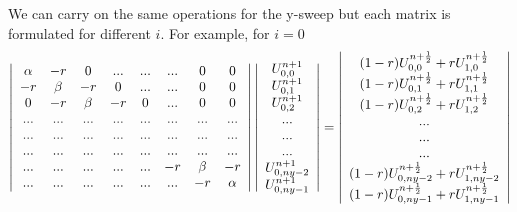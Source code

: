 We can carry on the same operations for the y-sweep but each matrix is formulated for different $i$. For example, for $i=0$ 
\[
\left| 
\begin{array}{ccc ccccc}
\alpha & -r      & 0     & ...  & ...  & ...  & 0       & 0      \\
-r     & \beta   & -r    & 0    & ...  & ...  & 0       & 0      \\
0      &  -r     &\beta  & -r   & 0    & ...  & 0       & 0      \\
...    & ...     & ...   & ...  & ...  & ...  & ...     & ...    \\
...    & ...     & ...   & ...  & ...  & ...  & ...     & ...    \\
...    & ...     & ...   & ...  & ...  & ...  & ...     & ...    \\
...    & ...     & ...   & ...  & ...  & -r   & \beta   & -r     \\
...    & ...     & ...   & ...  & ...  & ...  & -r      & \alpha \\
\end{array} 
\right|
\left| 
\begin{array}{c}
U_{0,0}^{n+1} \\
U_{0,1}^{n+1} \\
U_{0,2}^{n+1} \\
...\\
...\\
...\\
U_{0,ny-2}^{n+1} \\
U_{0,ny-1}^{n+1} \\
\end{array} 
\right|
=
\left| 
\begin{array}{c}
(1-r)U_{0,0}^{n+\frac{1}{2}} + rU_{1,0}^{n+\frac{1}{2}}\\
(1-r)U_{0,1}^{n+\frac{1}{2}} + rU_{1,1}^{n+\frac{1}{2}}\\
(1-r)U_{0,2}^{n+\frac{1}{2}} + rU_{1,2}^{n+\frac{1}{2}}\\
...\\
...\\
...\\
(1-r)U_{0,ny-2}^{n+\frac{1}{2}} + rU_{1,ny-2}^{n+\frac{1}{2}}\\
(1-r)U_{0,ny-1}^{n+\frac{1}{2}} + rU_{1,ny-1}^{n+\frac{1}{2}}\\
\end{array} 
\right|
\]



